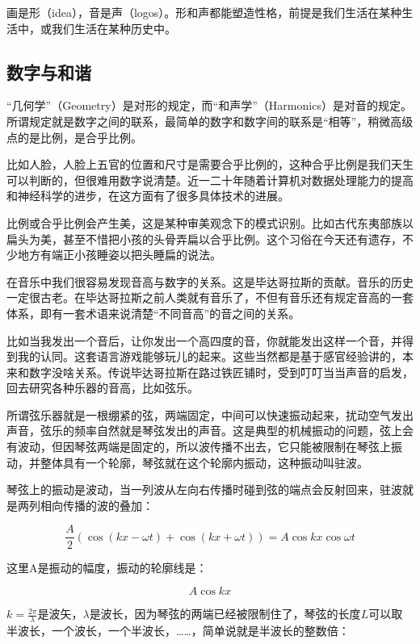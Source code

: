 画是形（idea），音是声（logos）。形和声都能塑造性格，前提是我们生活在某种生活中，或我们生活在某种历史中。

\subsection{数字与和谐}

“几何学”（Geometry）是对形的规定，而“和声学”（Harmonics）是对音的规定。所谓规定就是数字之间的联系，最简单的数字和数字间的联系是“相等”，稍微高级点的是比例，是合乎比例。

比如人脸，人脸上五官的位置和尺寸是需要合乎比例的，这种合乎比例是我们天生可以判断的，但很难用数字说清楚。近一二十年随着计算机对数据处理能力的提高和神经科学的进步，在这方面有了很多具体技术的进展。

比例或合乎比例会产生美，这是某种审美观念下的模式识别。比如古代东夷部族以扁头为美，甚至不惜把小孩的头骨弄扁以合乎比例。这个习俗在今天还有遗存，不少地方有端正小孩睡姿以把头睡扁的说法。

在音乐中我们很容易发现音高与数字的关系。这是毕达哥拉斯的贡献。音乐的历史一定很古老。在毕达哥拉斯之前人类就有音乐了，不但有音乐还有规定音高的一套体系，即有一套术语来说清楚“不同音高”的音之间的关系。

比如当我发出一个音后，让你发出一个高四度的音，你就能发出这样一个音，并得到我的认同。这套语言游戏能够玩儿的起来。这些当然都是基于感官经验讲的，本来和数字没啥关系。传说毕达哥拉斯在路过铁匠铺时，受到叮叮当当声音的启发，回去研究各种乐器的音高，比如弦乐。

所谓弦乐器就是一根绷紧的弦，两端固定，中间可以快速振动起来，扰动空气发出声音，弦乐的频率自然就是琴弦发出的声音。这是典型的机械振动的问题，弦上会有波动，但因琴弦两端是固定的，所以波传播不出去，它只能被限制在琴弦上振动，并整体具有一个轮廓，琴弦就在这个轮廓内振动，这种振动叫驻波。

琴弦上的振动是波动，当一列波从左向右传播时碰到弦的端点会反射回来，驻波就是两列相向传播的波的叠加：

\begin{equation}
\frac{A}{2} \left( \cos ( kx - \omega t ) + \cos ( kx + \omega t ) \right) = A \cos kx \cos \omega t
\end{equation}

这里A是振动的幅度，振动的轮廓线是：

\begin{equation}
A \cos kx 
\end{equation}

$k = \frac{2 \pi}{\lambda}$是波矢，$\lambda$是波长，因为琴弦的两端已经被限制住了，琴弦的长度$L$可以取半波长，一个波长，一个半波长，……，简单说就是半波长的整数倍：

